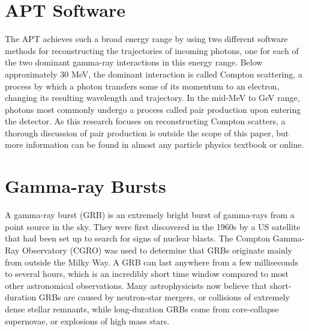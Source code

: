 \section{APT Software}
The APT achieves such a broad energy range by using two different software methods for reconstructing the trajectories of incoming photons, one for each of the two dominant gamma-ray interactions in this energy range. Below approximately 30 MeV, the dominant interaction is called Compton scattering, a process by which a photon transfers some of its momentum to an electron, changing its resulting wavelength and trajectory. In the mid-MeV to GeV range, photons most commonly undergo a process called pair production upon entering the detector. As this research focuses on reconstructing Compton scatters, a thorough discussion of pair production is outside the scope of this paper, but more information can be found in almost any particle physics textbook or online.

\section{Gamma-ray Bursts}
A gamma-ray burst (GRB) is an extremely bright burst of gamma-rays from a point source in the sky. They were first discovered in the 1960s by a US satellite that had been set up to search for signs of nuclear blasts. The Compton Gamma-Ray Observatory (CGRO) was used to determine that GRBs originate mainly from outside the Milky Way. A GRB can last anywhere from a few milliseconds to several hours, which is an incredibly short time window compared to most other astronomical observations. Many astrophysicists now believe that short-duration GRBs are caused by neutron-star mergers, or collisions of extremely dense stellar remnants, while long-duration GRBs come from core-collapse supernovae, or explosions of high mass stars.

